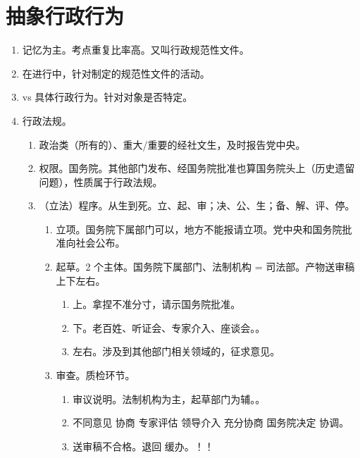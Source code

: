 \section{抽象行政行为}
\begin{enumerate}
  \item 记忆为主。考点重复比率高。又叫行政规范性文件。
  \item {}在进行中，针对制定的规范性文件的活动。
  \item vs 具体行政行为。针对对象是否特定。
  \item 行政法规。
        \begin{enumerate}
          \item 政治类（所有的）、重大/重要的经社文生，及时报告党中央。
          \item 权限。国务院。其他部门发布、经国务院批准也算国务院头上（历史遗留问题），性质属于行政法规。
          \item （立法）程序。从生到死。立、起、审；决、公、生；备、解、评、停。
                \begin{enumerate}
                  \item 立项。国务院下属部门可以，地方不能报请立项。党中央和国务院批准向社会公布。
                  \item 起草。2 个主体。国务院下属部门、法制机构 = 司法部。产物送审稿 \yjt 上下左右。
                        \begin{enumerate}
                          \item 上。拿捏不准分寸，请示国务院批准。
                          \item 下。老百姓、听证会、专家介入、座谈会。。
                          \item 左右。涉及到其他部门相关领域的，征求意见。
                        \end{enumerate}
                  \item 审查。质检环节。
                        \begin{enumerate}
                          \item 审议说明。法制机构为主，起草部门为辅。。
                          \item 不同意见 \yjt
                                协商 \yjt
                                专家评估 \hz 领导介入 \yjt
                                充分协商 \yjt
                                国务院决定 \hz 协调。
                          \item 送审稿不合格。退回 \hz 缓办。！！

\end{enumerate}
\end{enumerate}
\end{enumerate}
\end{enumerate}
